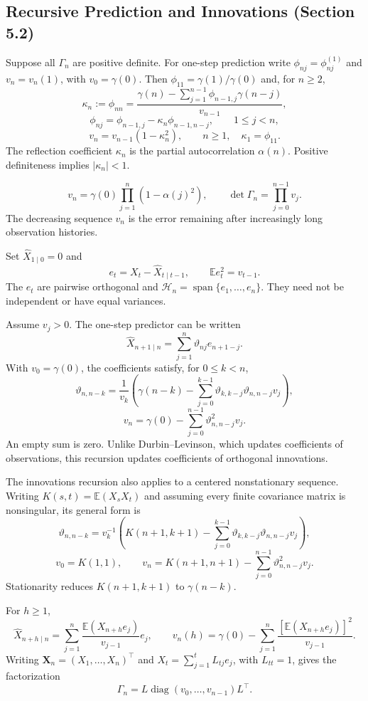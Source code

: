\subsection{Recursive Prediction and Innovations (Section 5.2)}
\begin{theorem}
Suppose all $\Gamma_n$ are positive definite. For one-step prediction write
$\phi_{nj}=\phi_{nj}^{(1)}$ and $v_n=v_n(1)$, with $v_0=\gamma(0)$.
Then $\phi_{11}=\gamma(1)/\gamma(0)$ and, for $n\ge2$,
\[
\kappa_n:=\phi_{nn}=
\frac{\gamma(n)-\sum_{j=1}^{n-1}\phi_{n-1,j}\gamma(n-j)}{v_{n-1}},
\]
\[
\phi_{nj}=\phi_{n-1,j}-\kappa_n\phi_{n-1,n-j},
\qquad 1\le j<n,
\]
\[
v_n=v_{n-1}(1-\kappa_n^2),\qquad n\ge1,
\quad \kappa_1=\phi_{11}.
\]
The reflection coefficient $\kappa_n$ is the partial autocorrelation
$\alpha(n)$. Positive definiteness implies $|\kappa_n|<1$.
\end{theorem}
\begin{corollary}
\[
v_n=\gamma(0)\prod_{j=1}^n(1-\alpha(j)^2),\qquad
\det\Gamma_n=\prod_{j=0}^{n-1}v_j.
\]
The decreasing sequence $v_n$ is the error remaining after increasingly
long observation histories.
\end{corollary}
\begin{definition}
Set $\widehat X_{1\mid0}=0$ and
\[
e_t=X_t-\widehat X_{t\mid t-1},\qquad
\mathbb E e_t^2=v_{t-1}.
\]
The $e_t$ are pairwise orthogonal and
$\mathcal H_n=\operatorname{span}\{e_1,\ldots,e_n\}$.
They need not be independent or have equal variances.
\end{definition}
\begin{theorem}
Assume $v_j>0$. The one-step predictor can be written
\[
\widehat X_{n+1\mid n}=\sum_{j=1}^n\vartheta_{nj}e_{n+1-j}.
\]
With $v_0=\gamma(0)$, the coefficients satisfy, for $0\le k<n$,
\[
\vartheta_{n,n-k}=\frac{1}{v_k}
\left(\gamma(n-k)-\sum_{j=0}^{k-1}
\vartheta_{k,k-j}\vartheta_{n,n-j}v_j\right),
\]
\[
v_n=\gamma(0)-\sum_{j=0}^{n-1}\vartheta_{n,n-j}^2v_j.
\]
An empty sum is zero. Unlike Durbin--Levinson, which updates coefficients
of observations, this recursion updates coefficients of orthogonal innovations.
\end{theorem}
The innovations recursion also applies to a centered nonstationary sequence.
Writing $K(s,t)=\mathbb E(X_sX_t)$ and assuming every finite covariance
matrix is nonsingular, its general form is
\[
\vartheta_{n,n-k}=v_k^{-1}\left(K(n+1,k+1)-
\sum_{j=0}^{k-1}\vartheta_{k,k-j}\vartheta_{n,n-j}v_j\right),
\]
\[
v_0=K(1,1),\qquad
v_n=K(n+1,n+1)-\sum_{j=0}^{n-1}\vartheta_{n,n-j}^2v_j.
\]
Stationarity reduces $K(n+1,k+1)$ to $\gamma(n-k)$.
\begin{proposition}
For $h\ge1$,
\[
\widehat X_{n+h\mid n}=\sum_{j=1}^n
\frac{\mathbb E(X_{n+h}e_j)}{v_{j-1}}e_j,
\qquad
v_n(h)=\gamma(0)-\sum_{j=1}^n
\frac{[\mathbb E(X_{n+h}e_j)]^2}{v_{j-1}}.
\]
Writing $\mathbf X_n=(X_1,\ldots,X_n)^\top$ and
$X_t=\sum_{j=1}^t L_{tj}e_j$, with $L_{tt}=1$, gives the factorization
\[
\Gamma_n=L\operatorname{diag}(v_0,\ldots,v_{n-1})L^\top.
\]
\end{proposition}


